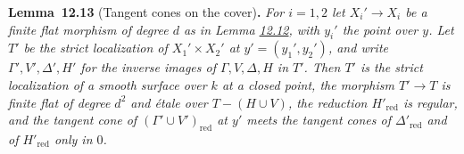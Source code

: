 \documentclass[11pt]{article}
\newenvironment{bpstatement}[2]{\par\addvspace{0.6\baselineskip}\noindent\textbf{#1}#2\textbf{.}\enspace\ignorespaces}
  {\par\addvspace{0.4\baselineskip}}
\newenvironment{bpstatementit}[2]{\begin{bpstatement}{#1}{#2}\itshape\ignorespaces}{\end{bpstatement}}
\begin{document}
\label{bp265}%
\begin{bpstatementit}{Lemma~12.13}{ (Tangent cones on the cover)}
For \(i=1,2\) let \(X_i'\to X_i\) be a finite flat morphism of degree \(d\) as in Lemma \hyperref[bp263]{12.12}, with \(y_i'\) the point over \(y\). Let \(T'\) be the strict localization of \(X_1'\times X_2'\) at \(y'=(y_1',y_2')\), and write \(\Gamma',V',\Delta',H'\) for the inverse images of \(\Gamma,V,\Delta,H\) in \(T'\). Then \(T'\) is the strict localization of a smooth surface over \(k\) at a closed point, the morphism \(T'\to T\) is finite flat of degree \(d^2\) and étale over \(T-(H\cup V)\), the reduction \(H'_{\mathrm{red}}\) is regular, and the tangent cone of \((\Gamma'\cup V')_{\mathrm{red}}\) at \(y'\) meets the tangent cones of \(\Delta'_{\mathrm{red}}\) and of \(H'_{\mathrm{red}}\) only in \(0\).
\end{bpstatementit}
\end{document}
